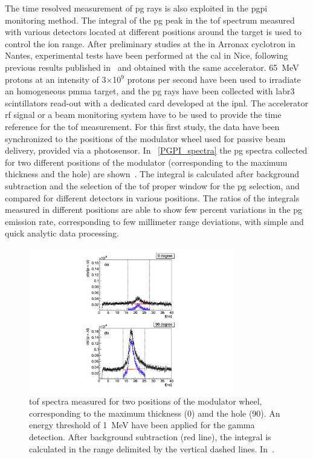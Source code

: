 The time resolved measurement of \gls{pg} rays is also exploited in the \gls{pgpi} monitoring method. The integral of the \gls{pg} peak in the \gls{tof} spectrum measured with various detectors located at different positions around the target is used to control the ion range.  After preliminary studies at the in Arronax cyclotron in Nantes, experimental tests have been performed at the \gls{cal} in Nice, following previous results published in~\cite{Carnicer2012} and obtained with the same accelerator. 65~MeV protons at an intensity of 3$\times$10$^9$ protons per second have been used to irradiate an homogeneous \gls{pmma} target, and the \gls{pg} rays have been collected with \gls{labr3} scintillators read-out with a dedicated card developed at the \gls{ipnl}. The accelerator \gls{rf} signal or a beam monitoring system have to be used to provide the time reference for the \gls{tof} measurement. For this first study, the data have been synchronized to the positions of the modulator wheel used for passive beam delivery, provided via a photosensor. In \figurename~\ref{PGPI_spectra} the \gls{pg} spectra collected for two different positions of the modulator (corresponding to the maximum thickness and the hole) are shown~\parencite{Krimmer2017b}. The integral is calculated after background subtraction and the selection of the \gls{tof} proper window for the \gls{pg} selection, and compared for different detectors in various positions. The ratios of the integrals measured in different positions are able to show few percent variations in the \gls{pg} emission rate, corresponding to few millimeter range deviations, with simple and quick analytic data processing.

\begin{figure}[!htbp]
\centering
\includegraphics[width=0.8\textwidth]{03_GraphicFiles/chapter2_GammaCameras/PGPI_spectra.pdf}
\caption{\gls{tof} spectra measured for two positions of the modulator wheel, corresponding to the maximum thickness (0\textdegree) amd the hole (90\textdegree). An energy threshold of 1~MeV have been applied for the gamma detection. After background subtraction (red line), the integral is calculated in the range delimited by the vertical dashed lines. In~\cite{Krimmer2017}.}
\label{chap2::fig::PGPI_spectra}
\end{figure}  

